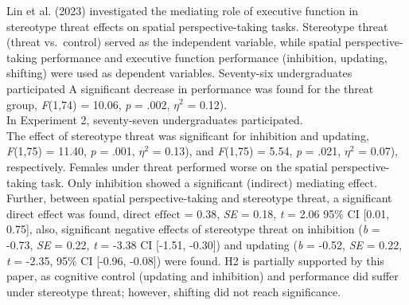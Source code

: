 \documentclass[
  stu, a4paper, 12pt,mask,floatsintext]{apa7}
\begin{document}
Lin et al. (2023) investigated the mediating role of executive function in stereotype threat effects on spatial perspective-taking tasks.
Stereotype threat (threat vs.~control) served as the independent variable, while spatial perspective-taking performance and executive function performance (inhibition, updating, shifting) were used as dependent variables.
Seventy-six undergraduates participated
A significant decrease in performance was found for the threat group, \emph{F}(1,74) = 10.06, \emph{p} = .002, \(\eta^{2}\) = 0.12).\\
In Experiment 2, seventy-seven undergraduates participated.\\
The effect of stereotype threat was significant for inhibition and updating, \emph{F}(1,75) = 11.40, \emph{p} = .001, \(\eta^{2}\) = 0.13), and \emph{F}(1,75) = 5.54, \emph{p} = .021, \(\eta^{2}\) = 0.07), respectively.
Females under threat performed worse on the spatial perspective-taking task.
Only inhibition showed a significant (indirect) mediating effect.
Further, between spatial perspective-taking and stereotype threat, a significant direct effect was found, \(\text{direct effect}\) = 0.38, \emph{SE} = 0.18, \emph{t} = 2.06 95\% \(\text{CI}\) {[}0.01, 0.75{]}, also, significant negative effects of stereotype threat on inhibition (\emph{b} = -0.73, \emph{SE} = 0.22, \emph{t} = -3.38 CI {[}-1.51, -0.30{]}) and updating (\emph{b} = -0.52, \emph{SE} = 0.22, \emph{t} = -2.35, 95\% CI {[}-0.96, -0.08{]}) were found.
H2 is partially supported by this paper, as cognitive control (updating and inhibition) and performance did suffer under stereotype threat; however, shifting did not reach significance.
\end{document}
